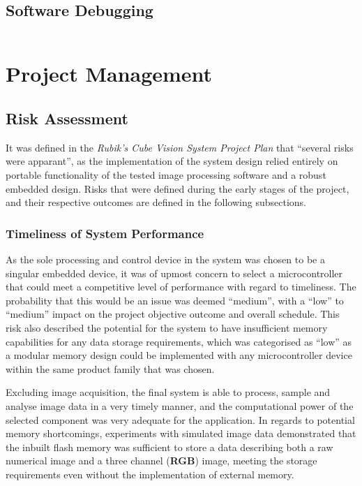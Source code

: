 \documentclass[11pt, a4paper, oneside]{Thesis} %
\begin{document}
\section{Software Debugging}

\begin{verbatim}

\end{verbatim}



\chapter{Project Management}
\label{chap:project_man} %

\section{Risk Assessment}
It was defined in the \emph{Rubik's Cube Vision System Project Plan} that ``several risks were apparant'', as the implementation of the system design relied entirely on portable functionality of the tested image processing software and a robust embedded design. Risks that were defined during the early stages of the project, and their respective outcomes are defined in the following subsections.

\subsection{Timeliness of System Performance}
As the sole processing and control device in the system was chosen to be a singular embedded device, it was of upmost concern to select a microcontroller that could meet a competitive level of performance with regard to timeliness. The probability that this would be an issue was deemed ``medium'', with a ``low'' to ``medium'' impact on the project objective outcome and overall schedule. This risk also described the potential for the system to have insufficient memory capabilities for any data storage requirements, which was categorised as ``low'' as a modular memory design could be implemented with any microcontroller device within the same product family that was chosen.

Excluding image acquisition, the final system is able to process, sample and analyse image data in a very timely manner, and the computational power of the selected component was very adequate for the application. In regards to potential memory shortcomings, experiments with simulated image data demonstrated that the inbuilt flash memory was sufficient to store a data describing both a raw numerical image and a three channel (\textbf{RGB}) image, meeting the storage requirements even without the implementation of external memory. 
\end{document}
